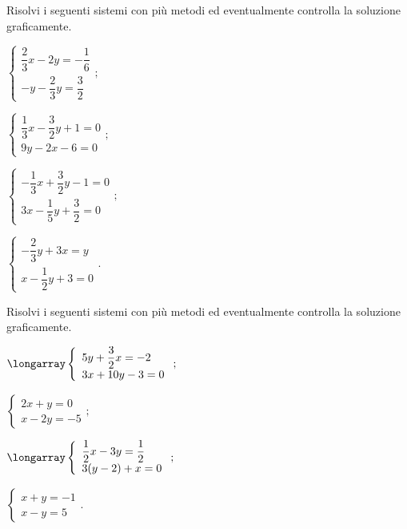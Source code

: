 \begin{esercizio}[\Ast]
 \label{ese:21.72}
 Risolvi i seguenti sistemi con più metodi ed eventualmente controlla
la soluzione graficamente.
\begin{multicols}{2}
\begin{enumeratea}
{\longarray
\item $\left\{\begin{array}{l}\dfrac{2}{3}x-2y=-{\dfrac{1}{6}}\\-y-\dfrac{2}{3}y=\dfrac{3}{2} \end{array}\right.;$
\item $\left\{\begin{array}{l}\dfrac{1}{3}x-\dfrac{3}{2}y+1=0\\9y-2x-6=0 \end{array}\right.;$
\item $\left\{\begin{array}{l}-{\dfrac{1}{3}}x+\dfrac{3}{2}y-1=0\\3x-\dfrac{1}{5}y+\dfrac{3}{2}=0 \end{array}\right.;$
\item $\left\{\begin{array}{l}-{\dfrac{2}{3}}y+3x=y\\x-\dfrac{1}{2}y+3=0 \end{array}\right..$}
\end{enumeratea}
\end{multicols}
\end{esercizio}
\pagebreak
\begin{esercizio}[\Ast]
 \label{ese:21.73}
 Risolvi i seguenti sistemi con più metodi ed eventualmente controlla
la soluzione graficamente.
\begin{multicols}{2}
\begin{enumeratea}
\item $\longarray\left\{\begin{array}{l}5y+\dfrac{3}{2}x=-2\\3x+10y-3=0 \end{array}\right.;$
\item $\left\{\begin{array}{l}{2x+y=0}\\{x-2y=-5}\end{array}\right.;$
\item $\longarray\left\{\begin{array}{l}\dfrac{1}{2}x-3y=\dfrac{1}{2}\\3(y-2)+x=0 \end{array}\right.;$
\item $\left\{\begin{array}{l}{x+y=-1}\\{x-y=5}\end{array}\right..$
\end{enumeratea}
\end{multicols}
\end{esercizio}

